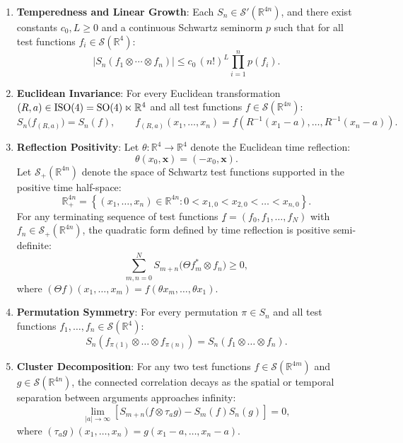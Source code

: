 \begin{enumerate}
    \item[$\mathbf{OS0}$] \textbf{Temperedness and Linear Growth}: Each $S_n \in \mathcal{S}'(\mathbb{R}^{4n})$, and there exist constants $c_0, L \ge 0$ and a continuous Schwartz seminorm $p$ such that for all test functions $f_i \in \mathcal{S}(\mathbb{R}^4)$:
    \begin{equation}
    |S_n(f_1 \otimes \cdots \otimes f_n)| \le c_0 \, (n!)^L \prod_{i=1}^n p(f_i).
    \end{equation}
    \item[$\mathbf{OS1}$] \textbf{Euclidean Invariance}: For every Euclidean transformation $(R, a) \in \mathrm{ISO}(4) = \mathrm{SO}(4) \ltimes \mathbb{R}^4$ and all test functions $f \in \mathcal{S}(\mathbb{R}^{4n})$:
    \begin{equation}
    S_n\bigl( f_{(R, a)} \bigr) = S_n(f), \qquad f_{(R, a)}(x_1, \dots, x_n) = f(R^{-1}(x_1 - a), \dots, R^{-1}(x_n - a)).
    \end{equation}
    \item[$\mathbf{OS2}$] \textbf{Reflection Positivity}: Let $\theta : \mathbb{R}^4 \to \mathbb{R}^4$ denote the Euclidean time reflection:
    \begin{equation}
    \theta(x_0, \mathbf{x}) = (-x_0, \mathbf{x}).
    \end{equation}
    Let $\mathcal{S}_+(\mathbb{R}^{4n})$ denote the space of Schwartz test functions supported in the positive time half-space:
    \begin{equation}
    \mathbb{R}_+^{4n} = \left\{ (x_1, \dots, x_n) \in \mathbb{R}^{4n} : 0 < x_{1,0} < x_{2,0} < \dots < x_{n,0} \right\}.
    \end{equation}
    For any terminating sequence of test functions $\underline{f} = (f_0, f_1, \dots, f_N)$ with $f_n \in \mathcal{S}_+(\mathbb{R}^{4n})$, the quadratic form defined by time reflection is positive semi-definite:
    \begin{equation}
    \sum_{m,n=0}^N S_{m+n}\bigl( \Theta f_m^* \otimes f_n \bigr) \ge 0,
    \end{equation}
    where $(\Theta f)(x_1, \dots, x_m) = f(\theta x_m, \dots, \theta x_1)$.
    \item[$\mathbf{OS3}$] \textbf{Permutation Symmetry}: For every permutation $\pi \in S_n$ and all test functions $f_1, \dots, f_n \in \mathcal{S}(\mathbb{R}^4)$:
    \begin{equation}
    S_n(f_{\pi(1)} \otimes \dots \otimes f_{\pi(n)}) = S_n(f_1 \otimes \dots \otimes f_n).
    \end{equation}
    \item[$\mathbf{OS4}$] \textbf{Cluster Decomposition}: For any two test functions $f \in \mathcal{S}(\mathbb{R}^{4m})$ and $g \in \mathcal{S}(\mathbb{R}^{4n})$, the connected correlation decays as the spatial or temporal separation between arguments approaches infinity:
    \begin{equation}
    \lim_{|a| \to \infty} \left[ S_{m+n}\bigl( f \otimes \tau_a g \bigr) - S_m(f) S_n(g) \right] = 0,
    \end{equation}
    where $(\tau_a g)(x_1, \dots, x_n) = g(x_1 - a, \dots, x_n - a)$.
\end{enumerate}

